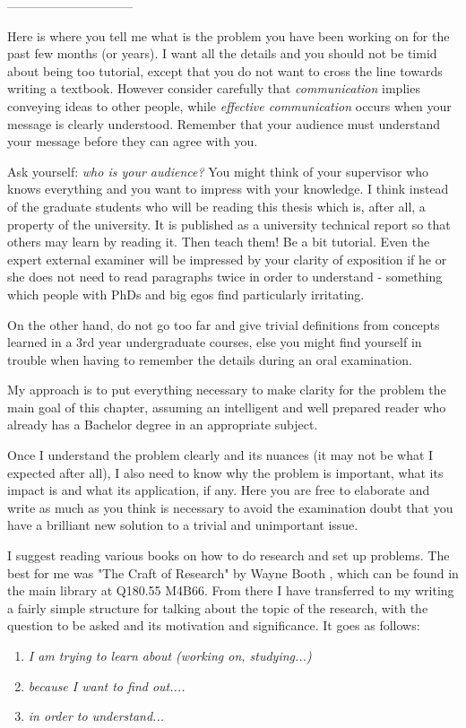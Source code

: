 \newline------------------------------\newline

\newline

\newline

Here is where you tell me what is the problem you have been working on for the past few months (or years). I want all the details and you should not be timid about being too tutorial, except that you do not want to cross the line towards writing a textbook. However consider carefully that \textit{communication} implies conveying ideas to other people, while \textit{effective communication} occurs when your message is clearly understood. Remember that your audience must understand your message before they can agree with you.

Ask yourself:
\textit{who is your audience?} You might think of your supervisor who knows everything and you want to impress with your knowledge. I think instead of the graduate students who will be reading this thesis which is, after all, a property of the university. It is published as a university technical report so that others may learn by reading it. Then teach them! Be a bit tutorial. Even the expert external examiner will be impressed by your clarity of exposition if he or she does not need to read paragraphs twice in order to understand - something which people with PhDs and big egos find particularly irritating.

On the other hand, do not go too far and give trivial definitions from concepts learned in a 3rd year undergraduate courses, else you might find yourself in trouble when having to remember the details during an oral examination.

My approach is to put everything necessary to make clarity for
the problem the main goal of this chapter, assuming an intelligent and well prepared reader who already has a Bachelor degree in an appropriate subject.

Once I understand the problem clearly and its nuances (it may not be what I expected after all), I also need to know why the problem is important, what its impact is and what its application, if any. Here you are free to elaborate and write as much as you think is necessary to avoid the examination doubt that you have a brilliant new solution to a trivial and unimportant issue.

I suggest reading various books on how to do research and set up problems. The best for me was "The Craft of Research" by Wayne Booth \cite{booth1}, which can be found in the main library at Q180.55 M4B66. From there I have transferred to my writing a fairly simple structure for talking about the topic of the research, with the question to be asked and its motivation and significance. It goes as follows:
\begin{enumerate}
\item {\textit{I am trying to learn about (working on, studying...)}}
\item {\textit{because I want to find out....}}
\item {\textit{in order to understand...}}
\end{enumerate}

